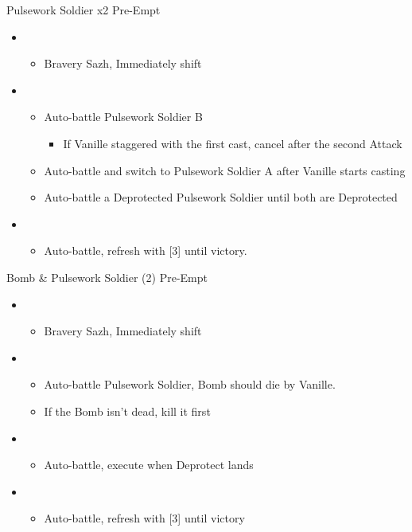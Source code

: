 \begin{multicols}{2}
	\begin{battle}[0:24]{Pulsework Soldier x2 Pre-Empt}
		\begin{itemize}
			\item \second
			      \begin{itemize}
				      \item Bravery Sazh, Immediately shift
			      \end{itemize}
			\item \third
			      \begin{itemize}
				      \item Auto-battle Pulsework Soldier B
				            \begin{itemize}
					            \item If Vanille staggered with the first cast, cancel after the second Attack
				            \end{itemize}
				      \item Auto-battle and switch to Pulsework Soldier A after Vanille starts casting
				      \item Auto-battle a Deprotected Pulsework Soldier until both are Deprotected
			      \end{itemize}
			\item \first
			      \begin{itemize}
				      \item Auto-battle, refresh with [3] until victory.
			      \end{itemize}
		\end{itemize}
	\end{battle}

	\begin{battle}[0:21]{Bomb \& Pulsework Soldier (2) Pre-Empt}
		\begin{itemize}
			\item \second
			      \begin{itemize}
				      \item Bravery Sazh, Immediately shift
			      \end{itemize}
			\item \first
			      \begin{itemize}
				      \item Auto-battle Pulsework Soldier, Bomb should die by Vanille.
				      \item If the Bomb isn't dead, kill it first
			      \end{itemize}
			\item \third
			      \begin{itemize}
				      \item Auto-battle, execute when Deprotect lands
			      \end{itemize}
			\item \first
			      \begin{itemize}
				      \item Auto-battle, refresh with [3] until victory
			      \end{itemize}
		\end{itemize}
	\end{battle}



\end{multicols}
